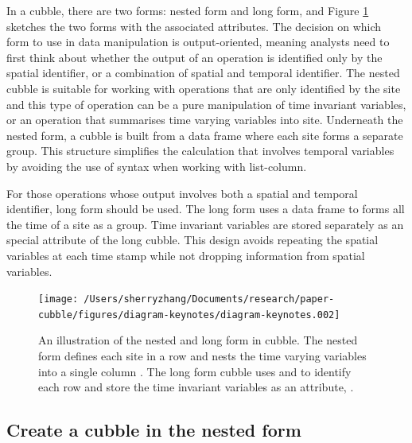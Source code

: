 \documentclass[
]{jss}
\begin{document}
In a cubble, there are two forms: nested form and long form, and Figure
\ref{fig:illu-cubble} sketches the two forms with the associated
attributes. The decision on which form to use in data manipulation is
output-oriented, meaning analysts need to first think about whether the
output of an operation is identified only by the spatial identifier, or
a combination of spatial and temporal identifier. The nested cubble is
suitable for working with operations that are only identified by the
site and this type of operation can be a pure manipulation of time
invariant variables, or an operation that summarises time varying
variables into site. Underneath the nested form, a cubble is built from
a  data frame where each site forms a separate group.
This structure simplifies the calculation that involves temporal
variables by avoiding the use of  syntax when working
with list-column.

For those operations whose output involves both a spatial and temporal
identifier, long form should be used. The long form uses a
 data frame to forms all the time of a site as a group.
Time invariant variables are stored separately as an special attribute
of the long cubble. This design avoids repeating the spatial variables
at each time stamp while not dropping information from spatial
variables.

\begin{CodeChunk}
\begin{figure}

{\centering \texttt{[image: /Users/sherryzhang/Documents/research/paper-cubble/figures/diagram-keynotes/diagram-keynotes.002]} 

}

\caption{An illustration of the nested and long form in cubble. The nested form defines each site in a row and nests the time varying variables into a single column . The long form cubble uses  and  to identify each row and store the time invariant variables as an attribute, .}\label{fig:illu-cubble}
\end{figure}
\end{CodeChunk}

\hypertarget{create-a-cubble-in-the-nested-form}{%
\subsection{Create a cubble in the nested
form}\label{create-a-cubble-in-the-nested-form}}
\end{document}
